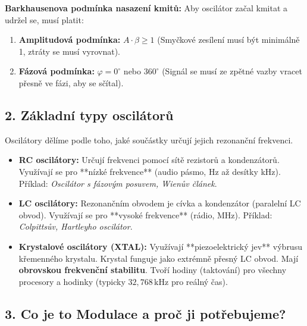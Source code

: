 \documentclass[a4paper,10pt]{article}
\begin{document}
\begin{vysvetlenibox}
\begin{center}
\end{center}

\begin{durazbox}
\textbf{Barkhausenova podmínka nasazení kmitů:}
Aby oscilátor začal kmitat a udržel se, musí platit:
\begin{enumerate}
    \item \textbf{Amplitudová podmínka:} $A \cdot \beta \ge 1$ (Smyčkové zesílení musí být minimálně 1, ztráty se musí vyrovnat).
    \item \textbf{Fázová podmínka:} $\varphi = 0^\circ$ nebo $360^\circ$ (Signál se musí ze zpětné vazby vracet přesně ve fázi, aby se sčítal).
\end{enumerate}
\end{durazbox}

\subsection*{2. Základní typy oscilátorů}

Oscilátory dělíme podle toho, jaké součástky určují jejich rezonanční frekvenci.

\begin{itemize}
    \item \textbf{RC oscilátory:} Určují frekvenci pomocí sítě rezistorů a kondenzátorů. Využívají se pro **nízké frekvence** (audio pásmo, Hz až desítky kHz). Příklad: \textit{Oscilátor s fázovým posuvem, Wienův článek}.
    \item \textbf{LC oscilátory:} Rezonančním obvodem je cívka a kondenzátor (paralelní LC obvod). Využívají se pro **vysoké frekvence** (rádio, MHz). Příklad: \textit{Colpittsův, Hartleyho oscilátor}.
    \item \textbf{Krystalové oscilátory (XTAL):} Využívají **piezoelektrický jev** výbrusu křemenného krystalu. Krystal funguje jako extrémně přesný LC obvod. Mají \textbf{obrovskou frekvenční stabilitu}. Tvoří hodiny (taktování) pro všechny procesory a hodinky (typicky $32{,}768\,\mathrm{kHz}$ pro reálný čas).
\end{itemize}

\subsection*{3. Co je to Modulace a proč ji potřebujeme?}


\end{vysvetlenibox}
\end{document}
